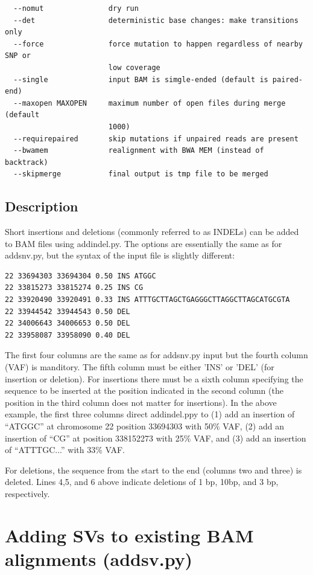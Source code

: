 \documentclass[letterpaper,11pt]{article}
\begin{document}
\begin{verbatim}
  --nomut               dry run
  --det                 deterministic base changes: make transitions only
  --force               force mutation to happen regardless of nearby SNP or
                        low coverage
  --single              input BAM is simgle-ended (default is paired-end)
  --maxopen MAXOPEN     maximum number of open files during merge (default
                        1000)
  --requirepaired       skip mutations if unpaired reads are present
  --bwamem              realignment with BWA MEM (instead of backtrack)
  --skipmerge           final output is tmp file to be merged

\end{verbatim}

\subsection{Description}
Short insertions and deletions (commonly referred to as INDELs) can be added to BAM files using addindel.py. The options are essentially the same as for addsnv.py, but the syntax of the input file is slightly different:

\begin{verbatim}
22 33694303 33694304 0.50 INS ATGGC
22 33815273 33815274 0.25 INS CG
22 33920490 33920491 0.33 INS ATTTGCTTAGCTGAGGGCTTAGGCTTAGCATGCGTA
22 33944542 33944543 0.50 DEL
22 34006643 34006653 0.50 DEL
22 33958087 33958090 0.40 DEL
\end{verbatim}

The first four columns are the same as for addsnv.py input but the fourth column (VAF) is manditory. The fifth column must be either 'INS' or 'DEL' (for insertion or deletion). For insertions there must be a sixth column specifying the sequence to be inserted at the position indicated in the second column (the position in the third column does not matter for insertions). In the above example, the first three columns direct addindel.ppy to (1) add an insertion of ``ATGGC'' at chromosome 22 position 33694303 with 50\% VAF, (2) add an insertion of ``CG'' at position 338152273 with 25\% VAF, and (3) add an insertion of ``ATTTGC...'' with 33\% VAF.

For deletions, the sequence from the start to the end (columns two and three) is deleted. Lines 4,5, and 6 above indicate deletions of 1 bp, 10bp, and 3 bp, respectively.

\section{Adding SVs to existing BAM alignments (addsv.py)}
\end{document}
